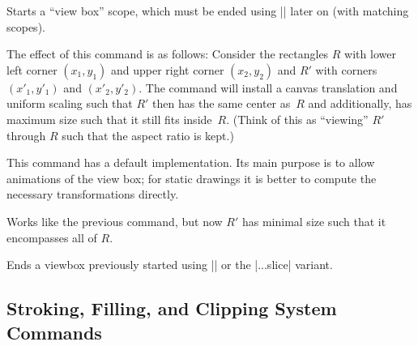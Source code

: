 \begin{command}{\pgfsys@viewboxmeet{}%
    }
  Starts a ``view box'' scope, which must be ended using
  |\pgfsys@endviewbox| later on (with matching scopes).

  The effect of this command is as follows: Consider the rectangles $R$
  with lower left corner $(x_1,y_1)$ and upper right corner
  $(x_2,y_2)$ and $R'$ with corners $(x'_1,y'_1)$ and
  $(x'_2,y'_2)$. The command will install a canvas translation and
  uniform scaling such that $R'$ then has the same center as~$R$ and
  additionally, has maximum size such that it still fits
  inside~$R$. (Think of this as ``viewing'' $R'$ through $R$ such that
  the aspect ratio is kept.)
  
  This command has a default implementation. Its main purpose is to
  allow animations of the view box; for static drawings it is better
  to compute the necessary transformations directly.
\end{command}

\begin{command}{\pgfsys@viewboxslice{}%
    }
  Works like the previous command, but now $R'$ has minimal size such
  that it encompasses all of $R$.
\end{command}

\begin{command}{\pgfsys@endviewbox}
  Ends a viewbox previously started using |\pgfsys@viewboxmeet| or the
  |...slice| variant.
\end{command}


\subsection{Stroking, Filling, and Clipping System Commands}

